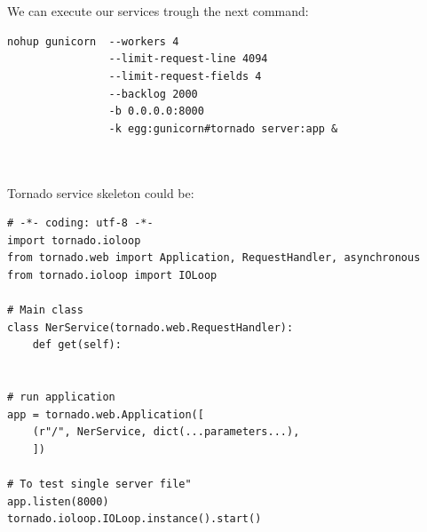 \documentclass[a4paper,11pt]{article}
\begin{document}
\\
\\
We can execute our services trough the next command:
\begin{verbatim}
nohup gunicorn  --workers 4 
                --limit-request-line 4094 
                --limit-request-fields 4 
                --backlog 2000
                -b 0.0.0.0:8000 
                -k egg:gunicorn#tornado server:app &
\end{verbatim}
\\
\\
Tornado service skeleton could be:
\begin{verbatim}
# -*- coding: utf-8 -*-
import tornado.ioloop
from tornado.web import Application, RequestHandler, asynchronous
from tornado.ioloop import IOLoop

# Main class
class NerService(tornado.web.RequestHandler):
    def get(self):
    
    
# run application
app = tornado.web.Application([
    (r"/", NerService, dict(...parameters...),
    ])
    
# To test single server file"
app.listen(8000)
tornado.ioloop.IOLoop.instance().start()
\end{verbatim}




\newpage
\end{document}
